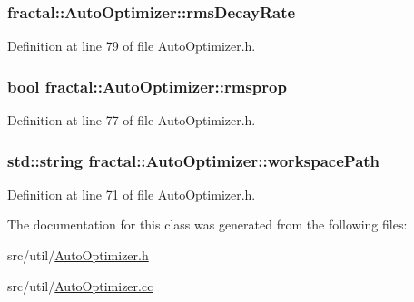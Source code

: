 \hypertarget{classfractal_1_1AutoOptimizer_a83f0519b89b1a33810fec7503a35f732}{
\subsubsection[{rms\+Decay\+Rate}]{ fractal\+::\+Auto\+Optimizer\+::rms\+Decay\+Rate\hspace{0.3cm}{\ttfamily [protected]}}}\label{classfractal_1_1AutoOptimizer_a83f0519b89b1a33810fec7503a35f732}


Definition at line 79 of file Auto\+Optimizer.\+h.

\hypertarget{classfractal_1_1AutoOptimizer_a358367f581267c957fc7fe705b19ece2}{
\subsubsection[{rmsprop}]{\setlength{\rightskip}{0pt plus 5cm}bool fractal\+::\+Auto\+Optimizer\+::rmsprop\hspace{0.3cm}{\ttfamily [protected]}}}\label{classfractal_1_1AutoOptimizer_a358367f581267c957fc7fe705b19ece2}


Definition at line 77 of file Auto\+Optimizer.\+h.

\hypertarget{classfractal_1_1AutoOptimizer_a2395471e6bc9585b3a42295a030a6f80}{
\subsubsection[{workspace\+Path}]{\setlength{\rightskip}{0pt plus 5cm}std\+::string fractal\+::\+Auto\+Optimizer\+::workspace\+Path\hspace{0.3cm}{\ttfamily [protected]}}}\label{classfractal_1_1AutoOptimizer_a2395471e6bc9585b3a42295a030a6f80}


Definition at line 71 of file Auto\+Optimizer.\+h.



The documentation for this class was generated from the following files\+:\begin{DoxyCompactItemize}
\item 
src/util/\hyperlink{AutoOptimizer_8h}{Auto\+Optimizer.\+h}\item 
src/util/\hyperlink{AutoOptimizer_8cc}{Auto\+Optimizer.\+cc}\end{DoxyCompactItemize}
